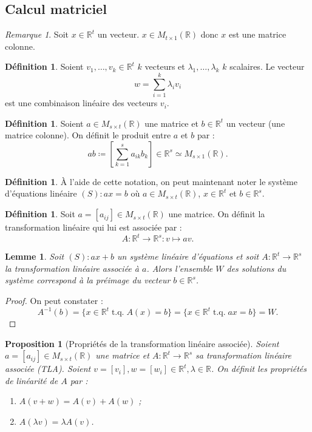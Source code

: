 \documentclass{article}
\DeclareMathOperator{\tq}{\text{ t.q. }}
\newcommand{\R}{\mathbb R}
\newcommand{\M}[3]{M_{#1 \times #2}(#3)}
\newtheorem{prp}[thm]{Proposition}
\newtheorem{lem}[thm]{Lemme}
\theoremstyle{definition}
\newtheorem{déf}[thm]{Définition}
\theoremstyle{remark}
\newtheorem*{rmq}{Remarque}
\begin{document}
	\subsection{Calcul matriciel}
		\begin{rmq} Soit $x \in \R^t$ un vecteur. $x \in \M t1\R$ donc $x$ est une matrice colonne. \end{rmq}

		\begin{déf} Soient $v_1, \ldots, v_k \in \R^t$ $k$ vecteurs et $\lambda_1, \ldots, \lambda_k$ $k$ scalaires. Le vecteur \[w = \sum_{i=1}^k\lambda_iv_i\]
		est une combinaison linéaire des vecteurs $v_i$. \end{déf}

		\begin{déf} Soient $a \in \M st\R$ une matrice et $b \in \R^t$ un vecteur (une matrice colonne). On définit le produit entre $a$ et $b$ par :
		\[ab \coloneqq \left[\sum_{k=1}^sa_{ik}b_k\right] \in \R^s \simeq \M s1\R.\] \end{déf}

		\begin{déf} À l'aide de cette notation, on peut maintenant noter le système d'équations linéaire $(S) : ax = b$ où $a \in \M st\R$, $x \in \R^t$ et $b \in \R^s$.
		\end{déf}

		\begin{déf} Soit $a = [a_{ij}] \in \M st\R$ une matrice. On définit la transformation linéaire qui lui est associée par : \[A : \R^t \to \R^s : v \mapsto av.\] \end{déf}

		\begin{lem} Soit $(S) : ax + b$ un système linéaire d'équations et soit $A : \R^t \to \R^s$ la transformation linéaire associée à $a$. Alors l'ensemble $W$ des
		solutions du système correspond à la préimage du vecteur $b \in \R^s$. \end{lem}
		
		\begin{proof} On peut constater : \[A^{-1}(b) = \{x \in \R^t \tq A(x) = b\} = \{x \in \R^t \tq ax = b\} = W.\] \end{proof}

		\begin{prp}[Propriétés de la transformation linéaire associée] Soient $a = [a_{ij}] \in \M st\R$ une matrice et $A : \R^t \to \R^s$ sa transformation
		linéaire associée (TLA). Soient $v = [v_i], w = [w_i] \in \R^t, \lambda \in \R$. On définit les propriétés de linéarité de $A$ par :
		\begin{enumerate}
			\item $A(v+w) = A(v) + A(w)$ ;
			\item $A(\lambda v) = \lambda A(v)$.
		\end{enumerate}
		\end{prp}
\end{document}
